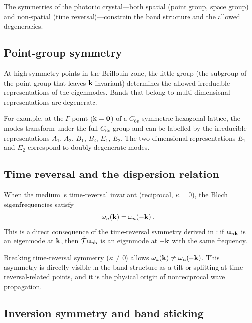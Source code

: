 The symmetries of the photonic crystal---both spatial (point group,
space group) and non-spatial (time reversal)---constrain the band
structure and the allowed degeneracies.

\subsection{Point-group symmetry}
\label{sec:ch4-point-group}

At high-symmetry points in the Brillouin zone, the little group
(the subgroup of the point group that leaves $\mathbf{k}$ invariant) determines
the allowed irreducible representations of the eigenmodes.  Bands that
belong to multi-dimensional representations are degenerate.

For example, at the $\Gamma$ point ($\mathbf{k}=\mathbf{0}$) of a
$C_{6v}$-symmetric hexagonal lattice, the modes transform under the
full $C_{6v}$ group and can be labelled by the irreducible
representations $A_1$, $A_2$, $B_1$, $B_2$, $E_1$, $E_2$.  The
two-dimensional representations $E_1$ and $E_2$ correspond to doubly
degenerate modes.

\subsection{Time reversal and the dispersion relation}
\label{sec:ch4-tr-dispersion}

When the medium is time-reversal invariant (reciprocal, $\kappa=0$),
the Bloch eigenfrequencies satisfy
\begin{equation}\label{eq:ch4-tr-symmetry}
  \omega_n(\mathbf{k}) = \omega_n(-\mathbf{k})\,.
\end{equation}
This is a direct consequence of the time-reversal symmetry derived in
: if $\mathbf{u}_{n\mathbf{k}}$ is an
eigenmode at $\mathbf{k}$, then $\hat{\mathcal{T}}\mathbf{u}_{n\mathbf{k}}$ is an eigenmode at
$-\mathbf{k}$ with the same frequency.

Breaking time-reversal symmetry ($\kappa\neq 0$) allows
$\omega_n(\mathbf{k})\neq\omega_n(-\mathbf{k})$.  This asymmetry is directly
visible in the band structure as a tilt or splitting at time-reversal-related
points, and it is the physical origin of nonreciprocal wave propagation.

\subsection{Inversion symmetry and band sticking}
\label{sec:ch4-inversion}


